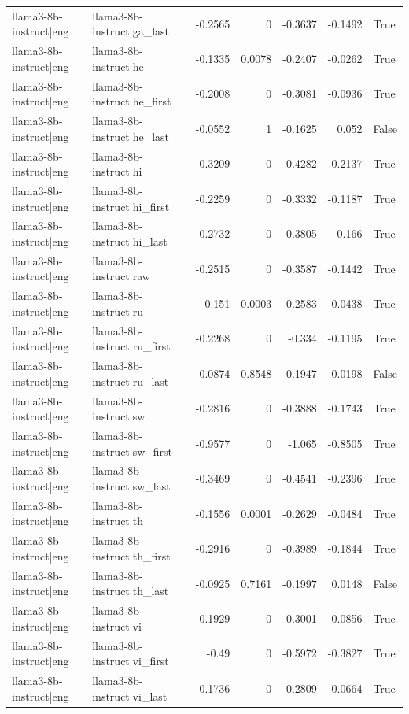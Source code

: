 \begin{table}
\begin{tabular}{l l r r r r l}
llama3-8b-instruct|eng & llama3-8b-instruct|ga_last & -0.2565 & 0 & -0.3637 & -0.1492 & True \\
llama3-8b-instruct|eng & llama3-8b-instruct|he & -0.1335 & 0.0078 & -0.2407 & -0.0262 & True \\
llama3-8b-instruct|eng & llama3-8b-instruct|he_first & -0.2008 & 0 & -0.3081 & -0.0936 & True \\
llama3-8b-instruct|eng & llama3-8b-instruct|he_last & -0.0552 & 1 & -0.1625 & 0.052 & False \\
llama3-8b-instruct|eng & llama3-8b-instruct|hi & -0.3209 & 0 & -0.4282 & -0.2137 & True \\
llama3-8b-instruct|eng & llama3-8b-instruct|hi_first & -0.2259 & 0 & -0.3332 & -0.1187 & True \\
llama3-8b-instruct|eng & llama3-8b-instruct|hi_last & -0.2732 & 0 & -0.3805 & -0.166 & True \\
llama3-8b-instruct|eng & llama3-8b-instruct|raw & -0.2515 & 0 & -0.3587 & -0.1442 & True \\
llama3-8b-instruct|eng & llama3-8b-instruct|ru & -0.151 & 0.0003 & -0.2583 & -0.0438 & True \\
llama3-8b-instruct|eng & llama3-8b-instruct|ru_first & -0.2268 & 0 & -0.334 & -0.1195 & True \\
llama3-8b-instruct|eng & llama3-8b-instruct|ru_last & -0.0874 & 0.8548 & -0.1947 & 0.0198 & False \\
llama3-8b-instruct|eng & llama3-8b-instruct|sw & -0.2816 & 0 & -0.3888 & -0.1743 & True \\
llama3-8b-instruct|eng & llama3-8b-instruct|sw_first & -0.9577 & 0 & -1.065 & -0.8505 & True \\
llama3-8b-instruct|eng & llama3-8b-instruct|sw_last & -0.3469 & 0 & -0.4541 & -0.2396 & True \\
llama3-8b-instruct|eng & llama3-8b-instruct|th & -0.1556 & 0.0001 & -0.2629 & -0.0484 & True \\
llama3-8b-instruct|eng & llama3-8b-instruct|th_first & -0.2916 & 0 & -0.3989 & -0.1844 & True \\
llama3-8b-instruct|eng & llama3-8b-instruct|th_last & -0.0925 & 0.7161 & -0.1997 & 0.0148 & False \\
llama3-8b-instruct|eng & llama3-8b-instruct|vi & -0.1929 & 0 & -0.3001 & -0.0856 & True \\
llama3-8b-instruct|eng & llama3-8b-instruct|vi_first & -0.49 & 0 & -0.5972 & -0.3827 & True \\
llama3-8b-instruct|eng & llama3-8b-instruct|vi_last & -0.1736 & 0 & -0.2809 & -0.0664 & True \\

\end{tabular}
\end{table}
